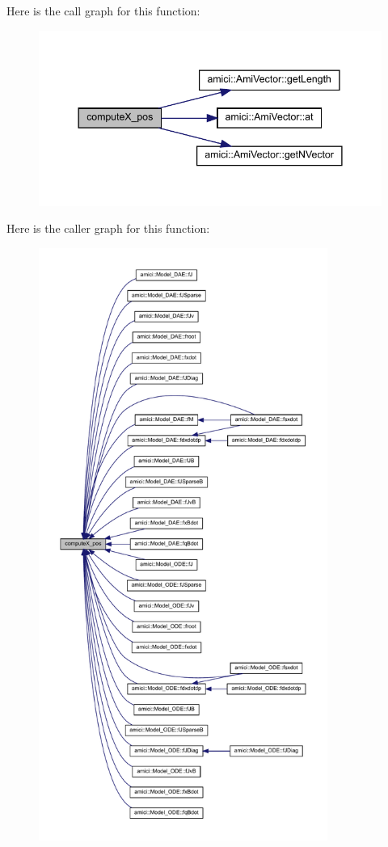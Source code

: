 Here is the call graph for this function\+:
\nopagebreak
\begin{figure}[H]
\begin{center}
\leavevmode
\includegraphics[width=344pt]{classamici_1_1_model_a0c06c5326bb82ceedba30171c122cb8a_cgraph}
\end{center}
\end{figure}
Here is the caller graph for this function\+:
\nopagebreak
\begin{figure}[H]
\begin{center}
\leavevmode
\includegraphics[height=550pt]{classamici_1_1_model_a0c06c5326bb82ceedba30171c122cb8a_icgraph}
\end{center}
\end{figure}


